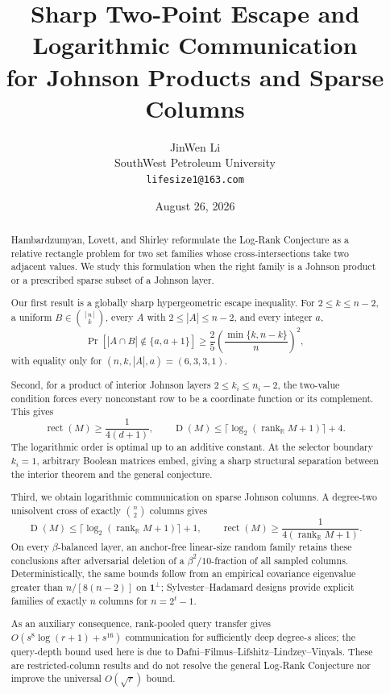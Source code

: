 \documentclass[11pt]{article}
\title{Sharp Two-Point Escape and Logarithmic Communication\\
for Johnson Products and Sparse Columns}
\author{JinWen Li\\
SouthWest Petroleum University\\
\texttt{lifesize1@163.com}}
\date{August 26, 2026}
\theoremstyle{definition}
\theoremstyle{remark}
\newcommand{\1}{\mathbf 1}
\newcommand{\rank}{\operatorname{rank}}
\newcommand{\rect}{\operatorname{rect}}
\newcommand{\Dcc}{\operatorname{D}}
\begin{document}
\maketitle

\begin{abstract}
Hambardzumyan, Lovett, and Shirley reformulate the Log-Rank Conjecture as a
relative rectangle problem for two set families whose cross-intersections take
two adjacent values.  We study this formulation when the right family is a
Johnson product or a prescribed sparse subset of a Johnson layer.

Our first result is a globally sharp hypergeometric escape inequality.  For
\(2\le k\le n-2\), a uniform \(B\in\binom{[n]}k\), every \(A\) with
\(2\le |A|\le n-2\), and every integer \(a\),
\[
 \Pr[|A\cap B|\notin\{a,a+1\}]
 \ge \frac25\left(\frac{\min\{k,n-k\}}n\right)^2,
\]
with equality only for
\((n,k,|A|,a)=(6,3,3,1)\).

Second, for a product of interior Johnson layers
\(2\le k_i\le n_i-2\), the two-value condition forces every nonconstant row
to be a coordinate function or its complement.  This gives
\[
 \rect(M)\ge\frac1{4(d+1)},\qquad
 \Dcc(M)\le\lceil\log_2(\rank_{\mathbb R}M+1)\rceil+4.
\]
The logarithmic order is optimal up to an additive constant.  At the selector boundary
\(k_i=1\), arbitrary Boolean matrices embed, giving a sharp structural
separation between the interior theorem and the general conjecture.

Third, we obtain logarithmic communication on sparse Johnson columns.
A degree-two unisolvent cross of exactly \(\binom n2\) columns gives
\[
 \Dcc(M)\le\lceil\log_2(\rank_{\mathbb R}M+1)\rceil+1,\qquad
 \rect(M)\ge\frac1{4(\rank_{\mathbb R}M+1)}.
\]
On every \(\beta\)-balanced layer, an anchor-free linear-size random family
retains these conclusions after adversarial deletion of a
\(\beta^2/10\)-fraction of all sampled columns.  Deterministically, the same
bounds follow from an empirical covariance eigenvalue greater than
\(n/[8(n-2)]\) on \(\mathbf1^\perp\); Sylvester--Hadamard designs provide
explicit families of exactly \(n\) columns for \(n=2^t-1\).

As an auxiliary consequence, rank-pooled query transfer gives
\(O(s^8\log(r+1)+s^{16})\) communication for sufficiently deep degree-\(s\)
slices; the query-depth bound used here is due to
Dafni--Filmus--Lifshitz--Lindzey--Vinyals.  These are restricted-column
results and do not resolve the general Log-Rank Conjecture nor improve the
universal \(O(\sqrt r)\) bound.
\end{abstract}
\end{document}

